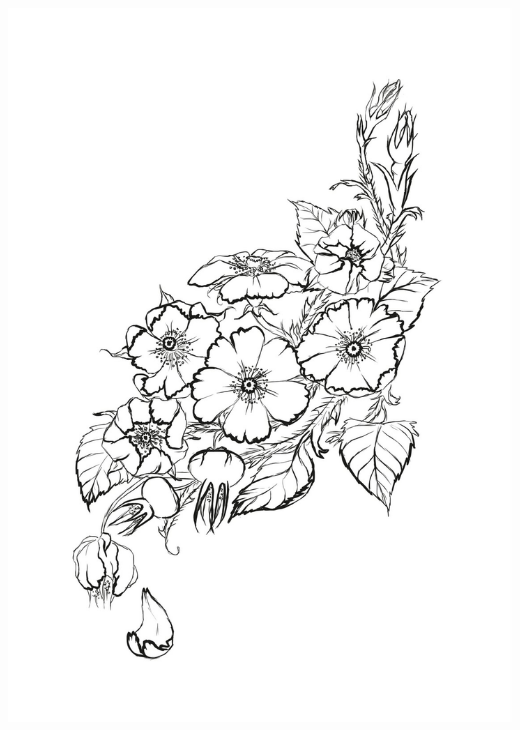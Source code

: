 \documentclass[letterpaper]{article}
\begin{document}
\begin{center}
\includegraphics[width=.8\columnwidth]{figures/dog_roses}
\end{center}

\printbibliography


\end{document}
